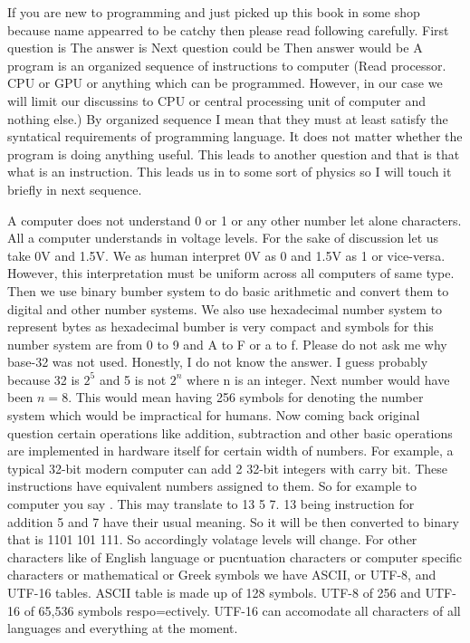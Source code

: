 If you are new to programming and just picked up this book in some shop because
name appearred to be catchy then please read following carefully. First question
is  The answer is  Next question
could be  Then answer would be {A program is an
organized sequence of instructions to computer (Read processor. CPU or GPU or
anything which can be programmed. However, in our case we will limit our
discussins to CPU or central processing unit of computer and nothing else.)} By 
organized sequence I mean that they must at least satisfy the syntatical
requirements of programming  language. It does not matter whether the program is
doing anything useful. This leads to another question and that is that what is
an instruction. This leads us in to some sort of physics so I will touch it
briefly in next sequence.

A computer does not understand 0 or 1 or any other number let alone characters.
All a computer understands in voltage levels. For the sake of discussion let us
take 0V and 1.5V. We as human interpret 0V as 0 and 1.5V as 1 or vice-versa.
However, this interpretation must be uniform across all computers of same type.
Then we use binary bumber system to do basic arithmetic and convert them to
digital and other number systems. We also use hexadecimal number system to 
represent bytes as hexadecimal bumber is very compact and symbols for this
number system are from 0 to 9 and A to F or a to f. Please do not ask me why
base-32 was not used. Honestly, I do not know the answer. I guess probably
because 32 is $2^5$ and 5 is not $2^n$ where n is an integer. Next number would
have been $n=8$. This would mean having 256 symbols for denoting the number
system which would be impractical for humans. Now coming back original question
certain operations like addition, subtraction and other basic operations are
implemented in hardware itself for certain width of numbers. For example, a
typical 32-bit modern computer can add 2 32-bit integers with carry bit. These
instructions have equivalent numbers assigned to them. So for example to
computer you say . This may translate to 13 5 7. 13 being
instruction for addition 5 and 7 have their usual meaning. So it will be then
converted to binary that is 1101 101 111. So accordingly volatage levels will
change. For other characters like of English language or pucntuation characters
or computer specific characters or mathematical or Greek symbols we have ASCII,
or UTF-8, and UTF-16 tables. ASCII table is made up of 128 symbols.
UTF-8 of 256 and UTF-16 of 65,536 symbols respo=ectively. UTF-16 can accomodate 
all characters of all languages and everything at the moment. 

